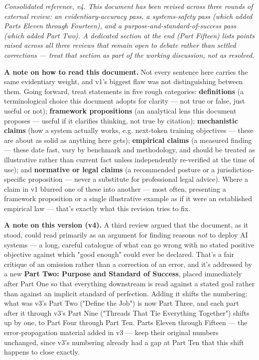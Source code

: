 \emph{Consolidated reference, v4. This document has been revised across three rounds of external review: an evidentiary-accuracy pass, a systems-safety pass (which added Parts Eleven through Fourteen), and a purpose-and-standard-of-success pass (which added Part Two). A dedicated section at the end (Part Fifteen) lists points raised across all three reviews that remain open to debate rather than settled corrections --- treat that section as part of the working discussion, not as resolved.}

\textbf{A note on how to read this document.} Not every sentence here carries the same evidentiary weight, and v1's biggest flaw was not distinguishing between them. Going forward, treat statements in five rough categories: \textbf{definitions} (a terminological choice this document adopts for clarity --- not true or false, just useful or not); \textbf{framework propositions} (an analytical lens this document proposes --- useful if it clarifies thinking, not true by citation); \textbf{mechanistic claims} (how a system actually works, e.g. next-token training objectives --- these are about as solid as anything here gets); \textbf{empirical claims} (a measured finding --- these date fast, vary by benchmark and methodology, and should be treated as illustrative rather than current fact unless independently re-verified at the time of use); and \textbf{normative or legal claims} (a recommended posture or a jurisdiction-specific proposition --- never a substitute for professional legal advice). Where a claim in v1 blurred one of these into another --- most often, presenting a framework proposition or a single illustrative example as if it were an established empirical law --- that's exactly what this revision tries to fix.

\textbf{A note on this version (v4).} A third review argued that the document, as it stood, could read primarily as an argument for finding reasons \emph{not} to deploy AI systems --- a long, careful catalogue of what can go wrong with no stated positive objective against which "good enough" could ever be declared. That's a fair critique of an omission rather than a correction of an error, and it's addressed by a new \textbf{Part Two: Purpose and Standard of Success}, placed immediately after Part One so that everything downstream is read against a stated goal rather than against an implicit standard of perfection. Adding it shifts the numbering: what was v3's Part Two ("Define the Job") is now Part Three, and each part after it through v3's Part Nine ("Threads That Tie Everything Together") shifts up by one, to Part Four through Part Ten. Parts Eleven through Fifteen --- the error-propagation material added in v3 --- keep their original numbers unchanged, since v3's numbering already had a gap at Part Ten that this shift happens to close exactly.

